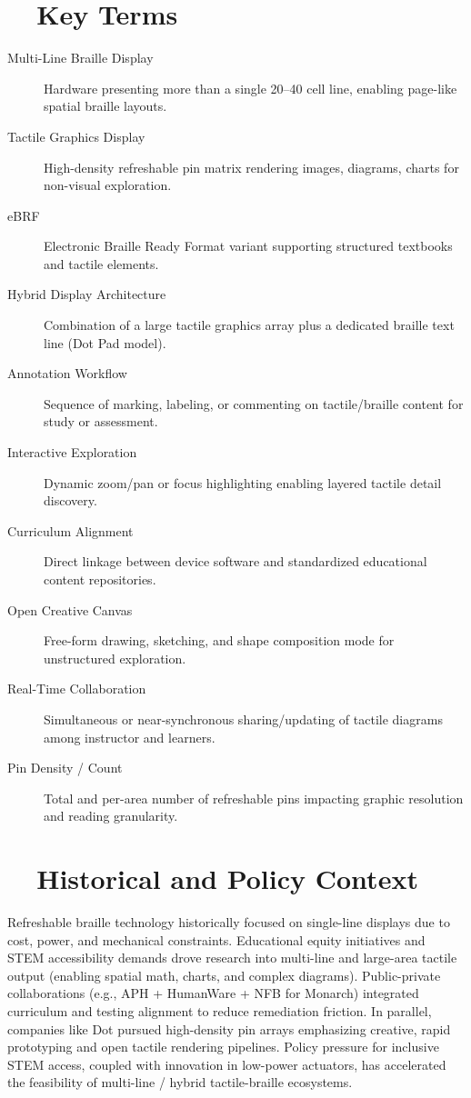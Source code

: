 \section{~~Key Terms}
\label{sec:sr29-key-terms}
\begin{description}
	\item[Multi-Line Braille Display] Hardware presenting more than a single 20–40 cell line, enabling page-like spatial braille layouts.
	\item[Tactile Graphics Display] High-density refreshable pin matrix rendering images, diagrams, charts for non-visual exploration.
	\item[eBRF] Electronic Braille Ready Format variant supporting structured textbooks and tactile elements\supercite{nelowvision_monarch}.
	\item[Hybrid Display Architecture] Combination of a large tactile graphics array plus a dedicated braille text line (Dot Pad model)\supercite{visionaid_dotpad}.
	\item[Annotation Workflow] Sequence of marking, labeling, or commenting on tactile/braille content for study or assessment.
	\item[Interactive Exploration] Dynamic zoom/pan or focus highlighting enabling layered tactile detail discovery.
	\item[Curriculum Alignment] Direct linkage between device software and standardized educational content repositories\supercite{ed_gov_aph}.
	\item[Open Creative Canvas] Free-form drawing, sketching, and shape composition mode for unstructured exploration\supercite{dot_appstore}.
	\item[Real-Time Collaboration] Simultaneous or near-synchronous sharing/updating of tactile diagrams among instructor and learners\supercite{ces_dotcanvas}.
	\item[Pin Density / Count] Total and per-area number of refreshable pins impacting graphic resolution and reading granularity.
\end{description}

\section{~~Historical and Policy Context}
\label{sec:sr29-history}
Refreshable braille technology historically focused on single-line displays due to cost, power, and mechanical constraints. Educational equity initiatives and STEM accessibility demands drove research into multi-line and large-area tactile output (enabling spatial math, charts, and complex diagrams). Public-private collaborations (e.g., APH + HumanWare + NFB for Monarch) integrated curriculum and testing alignment to reduce remediation friction\supercite{paths_monarch, floridareading_monarch}. In parallel, companies like Dot pursued high-density pin arrays emphasizing creative, rapid prototyping and open tactile rendering pipelines\supercite{visionaid_dotpad, rnib_dotpad}. Policy pressure for inclusive STEM access, coupled with innovation in low-power actuators, has accelerated the feasibility of multi-line / hybrid tactile-braille ecosystems.

